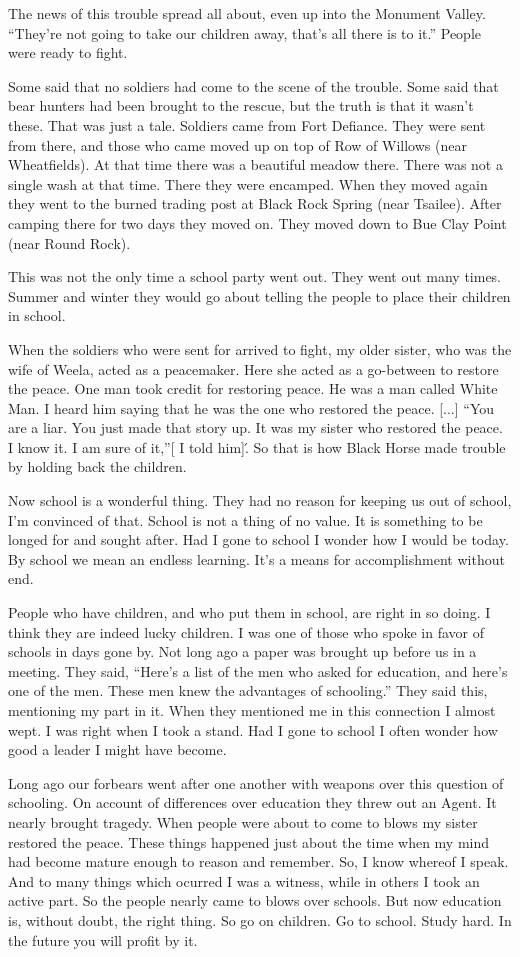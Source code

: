 The news of this trouble spread all about, even up into the Monument Valley. ``They're not going to take our children away, that's all there is to it.'' People were ready to fight.

Some said that no soldiers had come to the scene of the trouble. Some said that bear hunters had been brought to the rescue, but the truth is that it wasn't these. That was just a tale. Soldiers came from Fort Defiance. They were sent from there, and those who came moved up on top of Row of Willows (near Wheatfields). At that time there was a beautiful meadow there. There was not a single wash at that time. There they were encamped. When they moved again they went to the burned trading post at Black Rock Spring (near Tsailee). After camping there for two days they moved on. They moved down to Bue Clay Point (near Round Rock).

This was not the only time a school party went out. They went out many times. Summer and winter they would go about telling the people to place their children in school.

When the soldiers who were sent for arrived to fight, my older sister, who was the wife of Weela, acted as a peacemaker. Here she acted as a go-between to restore the peace. One man took credit for restoring peace. He was a man called White Man. I heard him saying that he was the one who restored the peace. [...] ``You are a liar. You just made that story up. It was my sister who restored the peace. I know it. I am sure of it,''[ I told him].́ So that is how Black Horse made trouble by holding back the children.

Now school is a wonderful thing. They had no reason for keeping us out of school, I'm convinced of that. School is not a thing of no value. It is something to be longed for and sought after. Had I gone to school I wonder how I would be today. By school we mean an endless learning. It's a means for accomplishment without end.

People who have children, and who put them in school, are right in so doing. I think they are indeed lucky children. I was one of those who spoke in favor of schools in days gone by. Not long ago a paper was brought up before us in a meeting. They said, ``Here's a list of the men who asked for education, and here's one of the men. These men knew the advantages of schooling.'' They said this, mentioning my part in it. When they mentioned me in this connection I almost wept. I was right when I took a stand. Had I gone to school I often wonder how good a leader I might have become.

Long ago our forbears went after one another with weapons over this question of schooling. On account of differences over education they threw out an Agent. It nearly brought tragedy. When people were about to come to blows my sister restored the peace. These things happened just about the time when my mind had become mature enough to reason and remember. So, I know whereof I speak. And to many things which ocurred I was a witness, while in others I took an active part. So the people nearly came to blows over schools. But now education is, without doubt, the right thing. So go on children. Go to school. Study hard. In the future you will profit by it.